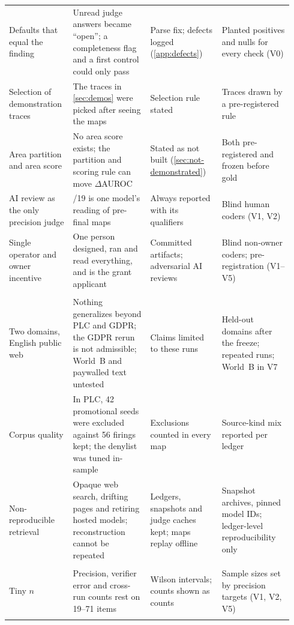 {\begin{longtable}{@{}>{\raggedright\arraybackslash}p{0.2\linewidth}>{\raggedright\arraybackslash}p{0.26\linewidth}>{\raggedright\arraybackslash}p{0.24\linewidth}>{\raggedright\arraybackslash}p{0.24\linewidth}@{}}
  Defaults that equal the finding & Unread judge answers became \enquote{open}; a completeness flag and a first control could only pass & Parse fix; defects logged (\cref{app:defects}) & Planted positives and nulls for every check (V0) \\
  Selection of demonstration traces & The traces in \cref{sec:demos} were picked after seeing the maps & Selection rule stated & Traces drawn by a pre-registered rule \\
  Area partition and area score & No area score exists; the partition and scoring rule can move $\Delta$AUROC & Stated as not built (\cref{sec:not-demonstrated}) & Both pre-registered and frozen before gold \\
  AI review as the only precision judge & 3/19 is one model's reading of pre-final maps & Always reported with its qualifiers & Blind human coders (V1, V2) \\
  Single operator and owner incentive & One person designed, ran and read everything, and is the grant applicant & Committed artifacts; adversarial AI reviews & Blind non-owner coders; pre-registration (V1--V5) \\
  \addlinespace
  \multicolumn{4}{@{}l}{\textit{External validity and reliability}}\\
  Two domains, English public web & Nothing generalizes beyond PLC and GDPR; the GDPR rerun is not admissible; World~B and paywalled text untested & Claims limited to these runs & Held-out domains after the freeze; repeated runs; World~B in V7 \\
  Corpus quality & In PLC, 42 promotional seeds were excluded against 56 firings kept; the denylist was tuned in-sample & Exclusions counted in every map & Source-kind mix reported per ledger \\
  Non-reproducible retrieval & Opaque web search, drifting pages and retiring hosted models; reconstruction cannot be repeated & Ledgers, snapshots and judge caches kept; maps replay offline & Snapshot archives, pinned model IDs; ledger-level reproducibility only \\
  \addlinespace
  \multicolumn{4}{@{}l}{\textit{Statistical conclusion validity}}\\
  Tiny $n$ & Precision, verifier error and cross-run counts rest on 19--71 items & Wilson intervals; counts shown as counts & Sample sizes set by precision targets (V1, V2, V5) \\
  \addlinespace
  \multicolumn{4}{@{}l}{\textit{Contamination and memorization}}\\

\end{longtable}}

